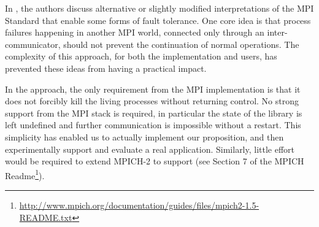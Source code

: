 In %
\cite{Gropp:2004:FTM:1080704.1080714}, the authors discuss alternative
or slightly modified interpretations of the MPI Standard that enable
some forms of fault tolerance. 
One core idea is that process failures happening in another MPI world,
connected only through an inter-communicator, should not prevent the
continuation of normal operations. The complexity of this approach, for
both the implementation and users, has prevented these ideas from having
a practical impact.

In the \cof approach, the only requirement from the MPI implementation
is that it does not forcibly kill the living processes without returning
control. No strong support from the MPI stack is required, in particular
the state of the library is left undefined and further communication is
impossible without a restart. This simplicity has enabled us to actually
implement our proposition, and then experimentally support and evaluate
a real \abft application. Similarly, little effort would be required to
extend MPICH-2 to support \cof (see Section 7 of the MPICH
Readme\footnote{\url{http://www.mpich.org/documentation/guides/files/mpich2-1.5-README.txt}}).




